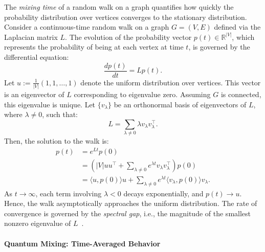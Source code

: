 \documentclass[12pt]{report}
\begin{document}
The \emph{mixing time} of a random walk on a graph quantifies how quickly the probability distribution over vertices converges to the stationary distribution. Consider a continuous-time random walk on a graph \( G = (V, E) \) defined via the Laplacian matrix \( L \). The evolution of the probability vector \( p(t) \in \mathbb{R}^{|V|} \), which represents the probability of being at each vertex at time \( t \), is governed by the differential equation:
\[
\frac{dp(t)}{dt} = Lp(t).
\]
Let \( u := \frac{1}{|V|}(1,1,\dots,1) \) denote the uniform distribution over vertices. This vector is an eigenvector of \( L \) corresponding to eigenvalue zero. Assuming \( G \) is connected, this eigenvalue is unique. Let \( \{ v_\lambda \} \) be an orthonormal basis of eigenvectors of \( L \), where \( \lambda \neq 0 \), such that:
\[
L = \sum_{\lambda \neq 0} \lambda v_\lambda v_\lambda^\top.
\]
Then, the solution to the walk is:
\begin{align}
p(t) &= e^{Lt}p(0) \label{eq:classical1} \\
     &= \left( |V| uu^\top + \sum_{\lambda \neq 0} e^{\lambda t} v_\lambda v_\lambda^\top \right)p(0) \label{eq:classical2} \\
     &= \langle u, p(0) \rangle u + \sum_{\lambda \neq 0} e^{\lambda t} \langle v_\lambda, p(0) \rangle v_\lambda. \label{eq:classical3}
\end{align}
As \( t \to \infty \), each term involving \( \lambda < 0 \) decays exponentially, and \( p(t) \to u \). Hence, the walk asymptotically approaches the uniform distribution. The rate of convergence is governed by the \emph{spectral gap}, i.e., the magnitude of the smallest nonzero eigenvalue of \( L \)~\cite{childs2022quantum}.

\paragraph{Quantum Mixing: Time-Averaged Behavior}
\end{document}
